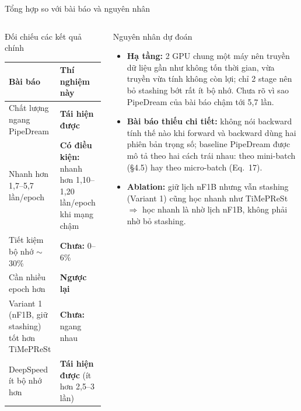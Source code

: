 \documentclass[10pt,aspectratio=169]{beamer}
\newcommand{\kw}[1]{\textcolor{uitblue}{\bfseries #1}}
\begin{document}
\begin{frame}{Tổng hợp so với bài báo và nguyên nhân}
\begin{columns}[T]
\begin{uitbox}{\faBalanceScale\; Đối chiếu các kết quả chính}
\scriptsize
\setlength{\tabcolsep}{3pt}
\renewcommand{\arraystretch}{1.35}
\begin{tabular}{@{}L{3.0cm}L{3.2cm}@{}}
\toprule
\textbf{Bài báo} & \textbf{Thí nghiệm này} \\
\midrule
Chất lượng ngang PipeDream & \textcolor{greenteal}{\textbf{Tái hiện được}} \\
Nhanh hơn 1,7--5,7 lần/epoch & \textcolor{accent}{\textbf{Có điều kiện:}} nhanh hơn 1,10--1,20 lần/epoch khi mạng chậm \\
Tiết kiệm bộ nhớ $\sim$30\% & \textcolor{red!60!black}{\textbf{Chưa:}} 0--6\% \\
Cần nhiều epoch hơn & \textcolor{red!60!black}{\textbf{Ngược lại}} \\
Variant 1 (nF1B, giữ stashing) tốt hơn TiMePReSt & \textcolor{red!60!black}{\textbf{Chưa:}} ngang nhau \\
DeepSpeed ít bộ nhớ hơn & \textcolor{greenteal}{\textbf{Tái hiện được}} (ít hơn 2,5--3 lần) \\
\bottomrule
\end{tabular}
\end{uitbox}

\begin{accentbox}{\faSearch\; Nguyên nhân dự đoán}
\scriptsize
\begin{itemize}
  \item \kw{Hạ tầng:} 2 GPU chung một máy nên truyền dữ liệu gần như không tốn thời gian, vừa truyền vừa tính không còn lợi; chỉ 2 stage nên bỏ stashing bớt rất ít bộ nhớ. Chưa rõ vì sao PipeDream của bài báo chậm tới 5,7 lần.
  \item \kw{Bài báo thiếu chi tiết:} không nói backward tính thế nào khi forward và backward dùng hai phiên bản trọng số; baseline PipeDream được mô tả theo hai cách trái nhau: theo mini-batch (\S4.5) hay theo micro-batch (Eq.~17).
  \item \kw{Ablation:} giữ lịch nF1B nhưng vẫn stashing (Variant 1) cũng học nhanh như TiMePReSt $\Rightarrow$ học nhanh là nhờ lịch nF1B, không phải nhờ bỏ stashing.
\end{itemize}
\end{accentbox}
\end{columns}
\end{frame}
\end{document}

